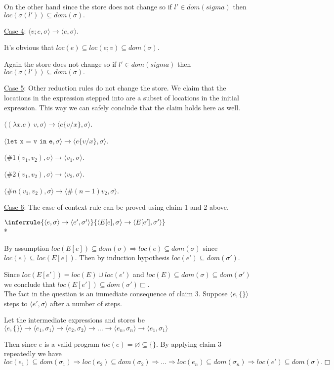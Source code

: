 \documentclass[10pt]{article}
\newcommand{\Rule}[3]{
    \label{rule:#1}
  \hfill
  \ensuremath{\inferrule{#2}{#3}}
  \hfill
}
\begin{document}
\begin{enumerate} [(a)]
    On the other hand since the store does not change so if $l' \in dom(sigma)$ then $loc(\sigma(l')) \subseteq dom(\sigma).$

    \underline{Case 4}: $\langle v;e, \sigma \rangle \rightarrow \langle e, \sigma \rangle$.

    It's obvious that $loc(e) \subseteq loc(e;v) \subseteq dom(\sigma)$.

    Again the store does not change so if $l' \in dom(sigma)$ then $loc(\sigma(l')) \subseteq dom(\sigma).$

    \underline{Case 5}: Other reduction rules do not change the store. We claim that the locations in the expression stepped into are a subset of locations in the initial expression. This way we can safely conclude that the claim holds here as well.

    $\langle (\lambda x.e)~v, \sigma \rangle \rightarrow \langle e\{v/x\}, \sigma \rangle$.

    $\langle \texttt{let x = v in e}, \sigma \rangle \rightarrow \langle e\{v/x\}, \sigma \rangle$.

    $\langle \#1(v_1, v_2), \sigma \rangle \rightarrow \langle v_1, \sigma \rangle$.

    $\langle \#2(v_1, v_2), \sigma \rangle \rightarrow \langle v_2, \sigma \rangle$.

    $\langle \#n(v_1, v_2), \sigma \rangle \rightarrow \langle \#(n-1)v_2, \sigma \rangle$.

    \underline{Case 6}: The case of context rule can be proved using claim 1 and 2 above.

    \Rule{}{
    \langle e, \sigma \rangle \rightarrow \langle e', \sigma' \rangle
  }{
    \langle E[e], \sigma \rangle \rightarrow \langle E[e'], \sigma' \rangle
  } \\*

    By assumption $loc(E[e]) \subseteq dom(\sigma) \Rightarrow loc(e) \subseteq dom(\sigma)$ since $loc(e) \subseteq loc (E[e])$. Then by induction hypothesis $loc(e') \subseteq dom(\sigma')$.

    Since $loc(E[e']) = loc(E) \cup loc(e')$ and $loc(E) \subseteq dom(\sigma) \subseteq dom(\sigma')$ we conclude that $loc(E[e']) \subseteq dom(\sigma')\Box$.\\

    The fact in the question is an immediate consequence of claim 3. Suppose $\langle e, \{\} \rangle$ steps to $\langle e', \sigma \rangle$ after a number of steps. 

    Let the intermediate expressions and stores be $\langle e, \{\} \rangle \rightarrow \langle e_1, \sigma_1 \rangle \rightarrow \langle e_2, \sigma_2 \rangle \rightarrow \ldots \rightarrow \langle e_n, \sigma_n \rangle \rightarrow \langle e_1, \sigma_1 \rangle$

    Then since $e$ is a valid program $loc(e) = \varnothing \subseteq \{\}$. By applying claim 3 repeatedly we have $loc(e_1) \subseteq dom(\sigma_1) \Rightarrow loc(e_2) \subseteq dom(\sigma_2) \Rightarrow \ldots \Rightarrow loc(e_n) \subseteq dom(\sigma_n) \Rightarrow loc(e') \subseteq dom(\sigma). \Box$
\end{enumerate}
\end{document}
